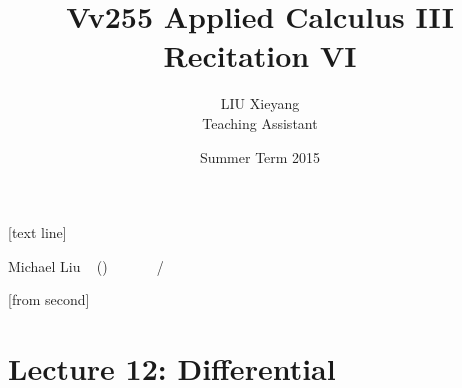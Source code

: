 \documentclass[10pt]{beamer}
\begin{document}



[text line]{%
	\color{blue!40!black}\parbox{\linewidth}{\vspace*{-8pt}Michael Liu ~ (\insertshortinstitute)\hfill\insertshorttitle\hfill\insertshortdate~~~~~~\insertframenumber{}~/~\inserttotalframenumber}}


[from second] 

\newcommand{\tabincell}[2]{\begin{tabular}{@{}#1@{}}#2\end{tabular}}


\title[Vv255 Applied Calculus III]{Vv255 Applied Calculus III\\{\small Recitation VI}}   
\author[Michael Liu]{LIU Xieyang\\{\tiny Teaching Assistant}} 
\date[Summer 2015]{Summer Term 2015} 
\begin{frame}
	\titlepage
\end{frame}






\section{Lecture 12: Differential} 
\end{document}
